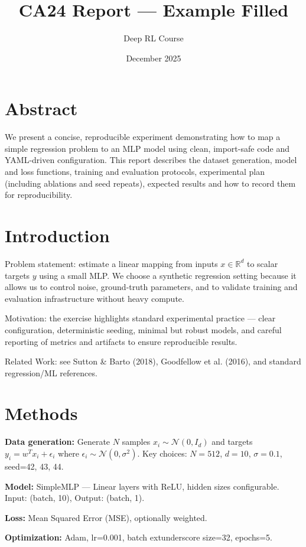 \documentclass[11pt]{article}
\title{CA24 Report --- Example Filled}
\author{Deep RL Course}
\date{December 2025}
\begin{document}
\maketitle

\section*{Abstract}
We present a concise, reproducible experiment demonstrating how to map a simple regression problem to an MLP model using clean, import-safe code and YAML-driven configuration. This report describes the dataset generation, model and loss functions, training and evaluation protocols, experimental plan (including ablations and seed repeats), expected results and how to record them for reproducibility.

\section*{Introduction}
Problem statement: estimate a linear mapping from inputs $x \in \mathbb{R}^d$ to scalar targets $y$ using a small MLP. We choose a synthetic regression setting because it allows us to control noise, ground-truth parameters, and to validate training and evaluation infrastructure without heavy compute.

Motivation: the exercise highlights standard experimental practice --- clear configuration, deterministic seeding, minimal but robust models, and careful reporting of metrics and artifacts to ensure reproducible results.

Related Work: see Sutton \& Barto (2018), Goodfellow et al. (2016), and standard regression/ML references.

\section*{Methods}
\textbf{Data generation:} Generate $N$ samples $x_i \sim \mathcal{N}(0, I_d)$ and targets $y_i = w^T x_i + \epsilon_i$ where $\epsilon_i \sim \mathcal{N}(0, \sigma^2)$. Key choices: $N=512$, $d=10$, $\sigma=0.1$, seed=42, 43, 44.

\textbf{Model:} SimpleMLP --- Linear layers with ReLU, hidden sizes configurable. Input: (batch, 10), Output: (batch, 1).

\textbf{Loss:} Mean Squared Error (MSE), optionally weighted.

\textbf{Optimization:} Adam, lr=0.001, batch	extunderscore size=32, epochs=5.
\end{document}
